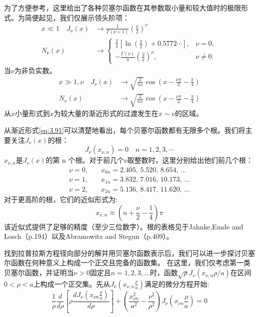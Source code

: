 \documentclass[lang=cn,10pt,newtx,bibend=biber,device=pad]{elegantbook}
\begin{document}
为了方便参考，这里给出了各种贝塞尔函数在其参数取小量和较大值时的极限形式。为简便起见，我们仅展示领头阶项：
\begin{equation}
    \begin{aligned}
    x \ll 1 \quad J_\nu(x) &\to \frac{1}{\Gamma(\nu + 1)} \left( \frac{x}{2} \right)^\nu \\
    N_\nu(x) &\to
\begin{cases}
\frac{2}{\pi} \left[ \ln \left( \frac{x}{2} \right) + 0.5772 \cdots \right], & \nu = 0, \\
-\frac{\Gamma(\nu)}{\pi} \left( \frac{2}{x} \right)^\nu, & \nu \neq 0.
\end{cases}
\end{aligned}
\end{equation}
当$\nu$为非负实数。
\begin{equation}\label{eq:3.91}
    \begin{aligned}
    x \gg 1,\nu \quad J_\nu(x) &\to \sqrt{\frac{2}{\pi x}} \cos \left( x - \frac{\nu\pi}{2} - \frac{\pi}{4} \right)\\
    N_\nu(x) &\to \sqrt{\frac{2}{\pi x}} \cos \left( x - \frac{\nu\pi}{2} - \frac{\pi}{4} \right)
    \end{aligned}
\end{equation}
从$x$小量形式到$x$为较大量的渐近形式的过渡发生在$x \sim  \nu$的区域。

从渐近形式\ref{eq:3.91}可以清楚地看出，每个贝塞尔函数都有无限多个根。我们将主要关注$ J_\nu(x) $的根：
\begin{equation}\label{eq:3.92}
    J_\nu(x_{\nu,n}) = 0 \quad n = 1,2,3,\cdots
\end{equation}
$x_{\nu,n}$是$J_\nu(x)$的第 n 个根。对于前几个$\nu$取整数时，这里分别给出他们前几个根：
\[
\begin{aligned}
\nu = 0, \quad & x_{0n} = 2.405, \, 5.520, \, 8.654, \, \dots \\
\nu = 1, \quad & x_{1n} = 3.832, \, 7.016, \, 10.173, \, \dots \\
\nu = 2, \quad & x_{2n} = 5.136, \, 8.417, \, 11.620, \, \dots
\end{aligned}
\]
对于更高阶的根，它们的近似形式为:
\[
    x_{\nu,n} \approx \left( n + \frac{\nu}{2} - \frac{1}{4} \right) \pi
\]
该近似式提供了足够的精度（至少三位数字）。根的表格见于Jahnke,Emde and Losch（p.194）以及Abramowitz and Stegun（p.409）。

找到拉普拉斯方程径向部分的解并用贝塞尔函数表示后，我们可以进一步探讨贝塞尔函数在何种意义上构成一个正交且完备的函数集。
在这里，我们仅考虑第一类贝塞尔函数，并证明当$\nu > 0$固定且$n = 1,2,3,\dots$时，函数$\sqrt{\rho}J_\nu(x_{\nu,n}\rho/a)$在区间$0<\rho<a$上构成一个正交集。先从$J_\nu(x_{\nu,n}\frac{\rho}{a})$满足的微分方程开始:
\begin{equation}
    \frac{1}{\rho} \frac{d}{d\rho} \left[ \rho \frac{dJ_\nu\left( x_{\nu n} \frac{\rho}{a} \right)}{d\rho} \right] + \left( \frac{x_{\nu n}^2}{a^2} - \frac{\nu^2}{\rho^2} \right) J_\nu\left( x_{\nu n} \frac{\rho}{a} \right) = 0
\end{equation}
\end{document}
